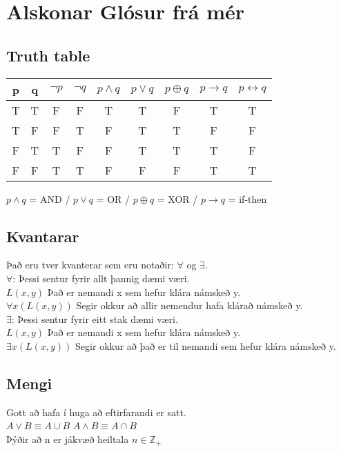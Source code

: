 \section*{Alskonar Glósur frá mér}
\subsection*{Truth table}
\begin{center}
    \begin{tabular}{ c|c|c|c|c|c|c|c|c }
        p & q & $\lnot p$ & $\lnot q$ & $p \wedge q$ & $p \vee q$ & $p \oplus q$ & $p \to q$ & $p \leftrightarrow q$
        \\ \hline
        T & T & F & F & T & T & F & T & T
        \\ \hline
        T & F & F & T & F & T & T & F & F
        \\ \hline
        F & T & T & F & F & T & T & T & F
        \\ \hline
        F & F & T & T & F & F & F & T & T
    \end{tabular}
\end{center}
$p \wedge q$ = AND / $p \vee q$ = OR / $p \oplus q$ = XOR / $p \to q$ = if-then
\subsection*{Kvantarar}
Það eru tver kvanterar sem eru notaðir: $\forall$ og $\exists$.\\
$\forall$: Þessi sentur fyrir allt þannig dæmi væri.\\
\indent $L(x,y)$ Það er nemandi x sem hefur klára námskeð y.\\
\indent $\forall x (L(x,y))$ Segir okkur að allir nemendur hafa klárað námskeð y.\\
$\exists$: Þessi sentur fyrir eitt stak dæmi væri.\\
\indent $L(x,y)$ Það er nemandi x sem hefur klára námskeð y.\\
\indent $\exists x (L(x,y))$ Segir okkur að það er til nemandi sem hefur klára námskeð y.
\subsection*{Mengi}
Gott að hafa í huga að eftirfarandi er satt.\\
$A \vee B \equiv A \cup B$ \quad $A \wedge B \equiv A \cap B$\\

Þýðir að n er jákvæð heiltala $n \in \mathbb{Z}_+$ 


\newpage